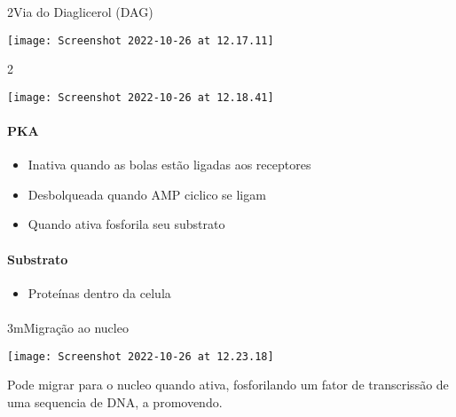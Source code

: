 \documentclass[\mainfilename]{subfiles}
\begin{document}
\begin{sectionBox}2{Via do Diaglicerol (DAG)} %
    
    \begin{center}
        \texttt{[image: Screenshot 2022-10-26 at 12.17.11]}
    \end{center}
    
\end{sectionBox}

\begin{sectionBox}2{} %
    
    \begin{center}
        \texttt{[image: Screenshot 2022-10-26 at 12.18.41]}
    \end{center}

    \paragraph*{PKA}
    \begin{itemize}
        \item Inativa quando as bolas estão ligadas aos receptores
        \item Desbolqueada quando AMP ciclico se ligam
        \item Quando ativa fosforila seu substrato
    \end{itemize}
    
    \paragraph*{Substrato}
    \begin{itemize}
        \item Proteínas dentro da celula
    \end{itemize}

    \paragraph*{}
    
    
\end{sectionBox}

\begin{sectionBox}3m{Migração ao nucleo} %
    
    \begin{center}
        \texttt{[image: Screenshot 2022-10-26 at 12.23.18]}
    \end{center}

    Pode migrar para o nucleo quando ativa, fosforilando um fator de transcrissão de uma sequencia de DNA, a promovendo.
    
\end{sectionBox}
\end{document}
